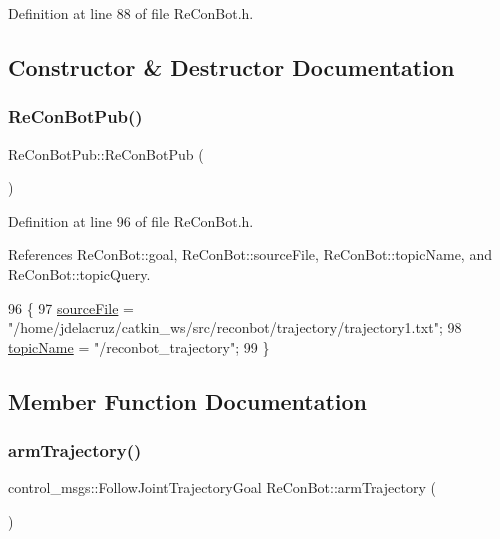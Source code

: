 Definition at line 88 of file Re\+Con\+Bot.\+h.



\subsection{Constructor \& Destructor Documentation}
\mbox{\label{class_re_con_bot_pub_a3e761c430b2934ad96e499dcd8bd67e2}} 
\subsubsection{\texorpdfstring{Re\+Con\+Bot\+Pub()}{ReConBotPub()}}
{\footnotesize\ttfamily Re\+Con\+Bot\+Pub\+::\+Re\+Con\+Bot\+Pub (\begin{DoxyParamCaption}{ }\end{DoxyParamCaption})\hspace{0.3cm}{\ttfamily [inline]}}



Definition at line 96 of file Re\+Con\+Bot.\+h.



References Re\+Con\+Bot\+::goal, Re\+Con\+Bot\+::source\+File, Re\+Con\+Bot\+::topic\+Name, and Re\+Con\+Bot\+::topic\+Query.


\begin{DoxyCode}
96                \{
97     \hyperlink{class_re_con_bot_a65cf4bed9bbabd92e1265d05507e0945}{sourceFile} = \textcolor{stringliteral}{"/home/jdelacruz/catkin\_ws/src/reconbot/trajectory/trajectory1.txt"};
98     \hyperlink{class_re_con_bot_a1d91d2ea8c0f16340440357906fb9ebf}{topicName} = \textcolor{stringliteral}{"/reconbot\_trajectory"};
99   \}
\end{DoxyCode}


\subsection{Member Function Documentation}
\mbox{\label{class_re_con_bot_a950f2769ca61ff7b663d86ed2cf19c14}} 
\subsubsection{\texorpdfstring{arm\+Trajectory()}{armTrajectory()}}
{\footnotesize\ttfamily control\+\_\+msgs\+::\+Follow\+Joint\+Trajectory\+Goal Re\+Con\+Bot\+::arm\+Trajectory (\begin{DoxyParamCaption}{ }\end{DoxyParamCaption})\hspace{0.3cm}{\ttfamily [inherited]}}



